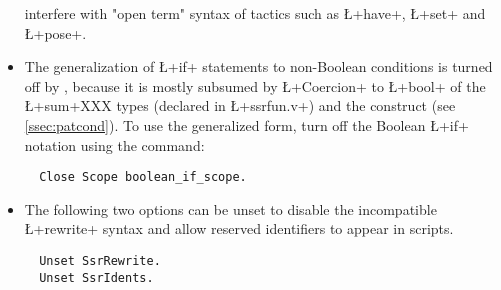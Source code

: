 \begin{itemize}
interfere with "open term" syntax of tactics such as \L+have+, \L+set+
and \L+pose+.
\item The generalization of \L+if+ statements to non-Boolean
conditions is turned off by \ssr{}, because it is mostly subsumed by
\L+Coercion+ to \L+bool+ of the \L+sum+XXX types (declared in
\L+ssrfun.v+) and the  construct (see
\ref{ssec:patcond}). To use the generalized form, turn off the \ssr{}
Boolean \L+if+ notation using the command:
\begin{lstlisting}
  Close Scope boolean_if_scope.
\end{lstlisting}
\item The following two options can be unset to disable the
      incompatible \L+rewrite+ syntax and allow
      reserved identifiers to appear in scripts.
\begin{lstlisting}
  Unset SsrRewrite.
  Unset SsrIdents.
\end{lstlisting}
\end{itemize}
